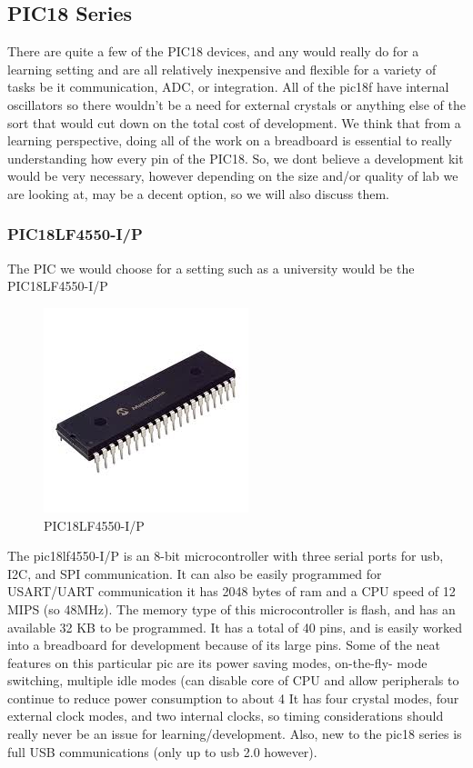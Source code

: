 \documentclass[12pt]{article}
\begin{document}
\subsection{PIC18 Series}
There are quite a few of the PIC18 devices, and any would really do for a learning setting
and are all relatively inexpensive and flexible for a variety of tasks be it communication, ADC,
or integration. All of the pic18f have internal oscillators so there wouldn't be a need for external
crystals or anything else of the sort that would cut down on the total cost of development. We
think that from a learning perspective, doing all of the work on a breadboard is essential to really
understanding how every pin of the PIC18. So, we dont believe a development kit would be very
necessary, however depending on the size and/or quality of lab we are looking at, may be a decent
option, so we will also discuss them.

\subsubsection{PIC18LF4550-I/P}

The PIC we would choose for a setting such as a university would be the
PIC18LF4550-I/P

\begin{figure}[h!]
  \centering
  \includegraphics[scale=.5]{images/pic}
  \caption{PIC18LF4550-I/P}
  \label{img:pic}
\end{figure}


The pic18lf4550-I/P is an 8-bit microcontroller with three serial ports for usb, I2C, and SPI
communication. It can also be easily programmed for USART/UART communication it has 2048
bytes of ram and a CPU speed of 12 MIPS (so 48MHz). The memory type of this microcontroller
is flash, and has an available 32 KB to be programmed. It has a total of 40 pins, and is easily
worked into a breadboard for development because of its large pins.
Some of the neat features on this particular pic are its power saving modes, on-the-fly- mode
switching, multiple idle modes (can disable core of CPU and allow peripherals to continue to reduce
power consumption to about 4%
It has four crystal modes, four external clock modes, and two internal clocks, so timing
considerations should really never be an issue for learning/development.
Also, new to the pic18 series is full USB communications (only up to usb 2.0 however).
\end{document}
